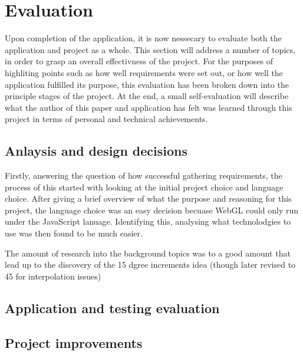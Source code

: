 \chapter{Evaluation}
Upon completion of the application, it is now nessecary to evaluate both the application and project as a whole. This section will address a number of topics, in order to grasp an overall effectivness of the project. For the purposes of highliting points such as how well requirements were set out, or how well the application fulfilled its purpose, this evaluation has been broken down into the principle stages of the project. At the end, a small self-evaluation will describe what the author of this paper and application has felt was learned through this project in terms of personal and technical achievements.

\section{Anlaysis and design decisions}
Firstly, answering the question of how successful gathering requirements, the process of this started with looking at the initial project choice and language choice. After giving a brief overview of what the purpose and reasoning for this project, the language choice was an easy decision becuase WebGL could only run under the JavaScript lanuage. Identifying this, analysing what technolodgies to use was then found to be much easier. 

The amount of research into the background topics was to a good amount that lead up to the discovery of the 15 dgree increments idea (though later revised to 45 for interpolation issues)



\section{Application and testing evaluation}

\section{Project improvements}

